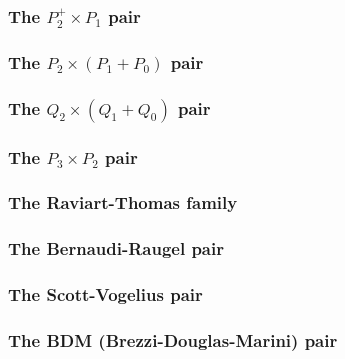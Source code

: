 \subsubsection{The ${ P}_2^+\times P_{1}$ pair \label{ss:p2pp1}}


\subsubsection{The ${ P}_2\times (P_1+P_0)$ pair} \label{ss:p2p1p0}


\subsubsection{The ${ Q}_2\times (Q_1+Q_0)$ pair} \label{ss:q2q1q0}


\subsubsection{The ${ P}_3\times P_2$ pair} \label{ss:p3p2}


\subsubsection{The Raviart-Thomas family} \label{ss:raviart_thomas}


\subsubsection{The Bernaudi-Raugel pair} \label{ss:bernaudi_raugel}


\subsubsection{The Scott-Vogelius pair} \label{ss:scott_vogelius}


\subsubsection{The BDM (Brezzi-Douglas-Marini) pair} \label{ss:bdm}


